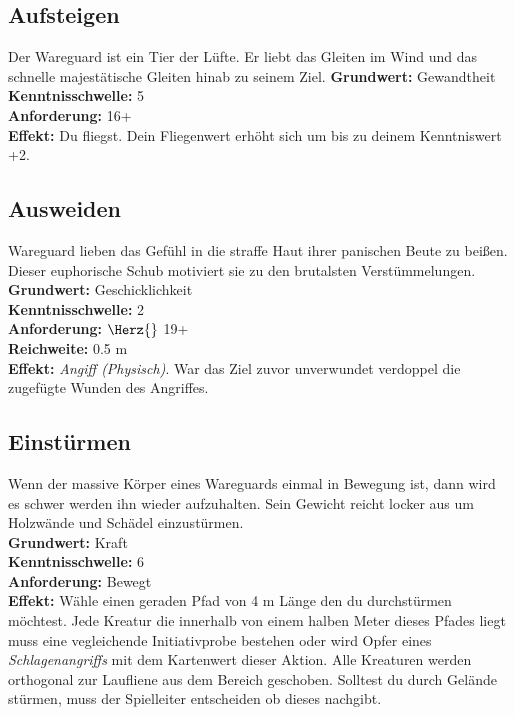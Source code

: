 \subsection*{Aufsteigen} \label{sk:aufsteigen}
Der Wareguard ist ein Tier der Lüfte. Er liebt das Gleiten im Wind und das schnelle majestätische Gleiten hinab zu seinem Ziel.
\textbf{Grundwert:} Gewandtheit \\
\textbf{Kenntnisschwelle:} 5 \\
\textbf{Anforderung:} 16+ \\
\textbf{Effekt:} Du fliegst. Dein Fliegenwert erhöht sich um bis zu deinem Kenntniswert +2.

\subsection*{Ausweiden} \label{sk:ausweiden}
Wareguard lieben das Gefühl in die straffe Haut ihrer panischen Beute zu beißen. Dieser euphorische Schub motiviert sie zu den brutalsten Verstümmelungen.
\textbf{Grundwert:} Geschicklichkeit \\
\textbf{Kenntnisschwelle:} 2 \\
\textbf{Anforderung:} $\Herz{}$ 19+ \\
\textbf{Reichweite:} 0.5 m \\
\textbf{Effekt:} \textit{Angiff (Physisch)}. War das Ziel zuvor unverwundet verdoppel die zugefügte Wunden des Angriffes.

\subsection*{Einstürmen} \label{sk:einstürmen}
Wenn der massive Körper eines Wareguards einmal in Bewegung ist, dann wird es schwer werden ihn wieder aufzuhalten. Sein Gewicht reicht locker aus um Holzwände und Schädel einzustürmen.\\
\textbf{Grundwert:} Kraft \\
\textbf{Kenntnisschwelle:} 6 \\
\textbf{Anforderung:} Bewegt \\
\textbf{Effekt:} Wähle einen geraden Pfad von 4 m Länge den du durchstürmen möchtest. Jede Kreatur die innerhalb von einem halben Meter dieses Pfades liegt muss eine vegleichende Initiativprobe bestehen oder wird Opfer eines \textit{Schlagenangriffs} mit dem Kartenwert dieser Aktion. Alle Kreaturen werden orthogonal zur Laufliene aus dem Bereich geschoben. Solltest du durch Gelände stürmen, muss der Spielleiter entscheiden ob dieses nachgibt.

